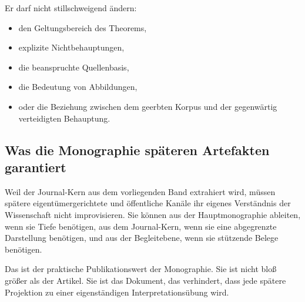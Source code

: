 Er darf nicht stillschweigend ändern:

\begin{itemize}
\item den Geltungsbereich des Theorems,
\item explizite Nichtbehauptungen,
\item die beanspruchte Quellenbasis,
\item die Bedeutung von Abbildungen,
\item oder die Beziehung zwischen dem geerbten Korpus und der gegenwärtig verteidigten Behauptung.
\end{itemize}

\subsection{Was die Monographie späteren Artefakten garantiert}

Weil der Journal-Kern aus dem vorliegenden Band extrahiert wird, müssen spätere eigentümergerichtete und öffentliche
Kanäle ihr eigenes Verständnis der Wissenschaft nicht improvisieren.
Sie können aus der Hauptmonographie ableiten, wenn sie Tiefe benötigen, aus dem Journal-Kern, wenn sie eine
abgegrenzte Darstellung benötigen, und aus der Begleitebene, wenn sie stützende Belege benötigen.

Das ist der praktische Publikationswert der Monographie.
Sie ist nicht bloß größer als der Artikel.
Sie ist das Dokument, das verhindert, dass jede spätere Projektion zu einer eigenständigen
Interpretationsübung wird.

\clearpage
